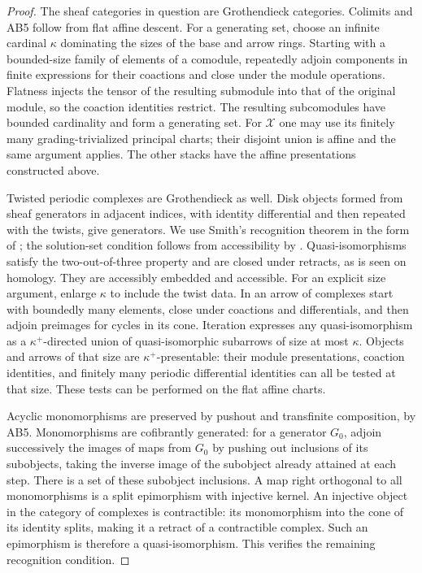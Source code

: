 \begin{proof}
The sheaf categories in question are Grothendieck categories.  Colimits
and AB5 follow from flat affine descent.  For a generating set, choose
an infinite cardinal $\kappa$ dominating the sizes of the base and
arrow rings.  Starting with a bounded-size family of elements of a
comodule, repeatedly adjoin components in finite expressions for
their coactions and close under the module operations.  Flatness
injects the tensor of the resulting submodule into that of the
original module, so the coaction identities restrict.  The resulting
subcomodules have bounded cardinality and form a generating set.
For $\mathcal X$ one may use its finitely many grading-trivialized
principal charts; their disjoint union is affine and the same argument
applies.  The other stacks have the affine presentations constructed
above.

Twisted periodic complexes are Grothendieck as well.  Disk objects
formed from sheaf generators in adjacent indices, with identity
differential and then repeated with the twists, give generators.
We use Smith's recognition theorem in the form of
\cite[Theorem~1.7]{Beke2000}; the solution-set condition follows from
accessibility by \cite[Proposition~1.15]{Beke2000}.
Quasi-isomorphisms satisfy the two-out-of-three property and are closed
under retracts, as is seen on homology.  They are accessibly embedded
and accessible.  For an explicit size argument,
enlarge $\kappa$ to include the twist data.  In an arrow of complexes
start with boundedly many elements, close under coactions and
differentials, and then adjoin preimages for cycles in its cone.
Iteration expresses any quasi-isomorphism as a $\kappa^+$-directed
union of quasi-isomorphic subarrows of size at most $\kappa$.
Objects and arrows of that size are $\kappa^+$-presentable: their
module presentations, coaction identities, and finitely many
periodic differential identities can all be tested at that size.
These tests can be performed on the flat affine charts.

Acyclic monomorphisms are preserved by pushout and transfinite
composition, by AB5.  Monomorphisms are cofibrantly generated: for a
generator $G_0$, adjoin successively the images of maps from $G_0$ by
pushing out inclusions of its subobjects, taking the inverse image
of the subobject already attained at each step.  There is a set of
these subobject inclusions.  A map right orthogonal to all
monomorphisms is a split epimorphism with injective kernel.  An
injective object in the category of complexes is contractible:
its monomorphism into the cone of its identity splits, making it a
retract of a contractible complex.  Such an epimorphism is therefore
a quasi-isomorphism.  This verifies the remaining recognition
condition.


\end{proof}
